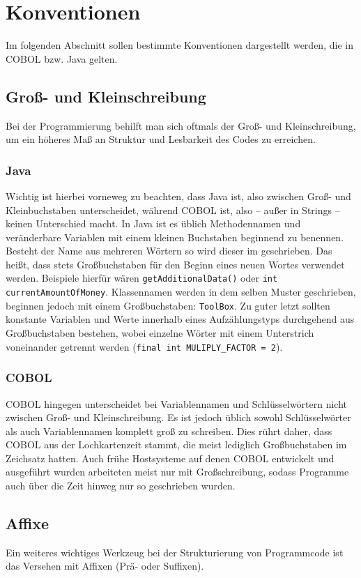 \section{Konventionen}
Im folgenden Abschnitt sollen bestimmte Konventionen dargestellt werden, die in COBOL bzw. Java gelten.
\subsection*{Groß- und Kleinschreibung}
Bei der Programmierung behilft man sich oftmals der Groß- und Kleinschreibung, um ein höheres Maß an Struktur und Lesbarkeit des Codes zu erreichen. 
\subsubsection*{Java}
Wichtig ist hierbei vorneweg zu beachten, dass Java  ist, also zwischen Groß- und Kleinbuchstaben unterscheidet, während COBOL  ist, also -- außer in Strings -- keinen Unterschied macht.
In Java ist es üblich Methodennamen und veränderbare Variablen mit einem kleinen Buchstaben beginnend zu benennen. Besteht der Name aus mehreren Wörtern so wird dieser im  geschrieben. Das heißt, dass stets Großbuchstaben für den Beginn eines neuen Wortes verwendet werden. Beispiele hierfür wären \texttt{getAdditionalData()} oder \texttt{int currentAmountOfMoney}. Klassennamen werden in dem selben Muster geschrieben, beginnen jedoch mit einem Großbuchstaben: \texttt{ToolBox}. Zu guter letzt sollten konstante Variablen und Werte innerhalb eines Aufzählungstyps durchgehend aus Großbuchstaben bestehen, wobei einzelne Wörter mit einem Unterstrich voneinander getrennt werden (\texttt{final int MULIPLY_FACTOR = 2}). 
\subsubsection*{COBOL}
COBOL hingegen unterscheidet bei Variablennamen und Schlüsselwörtern nicht zwischen Groß- und Kleinschreibung. Es ist jedoch üblich sowohl Schlüsselwörter als auch Variablennamen komplett groß zu schreiben. Dies rührt daher, dass COBOL aus der Lochkartenzeit stammt, die meist lediglich Großbuchstaben im Zeichsatz hatten. Auch frühe Hostsysteme auf denen COBOL entwickelt und ausgeführt wurden arbeiteten meist nur mit Großschreibung, sodass Programme auch über die Zeit hinweg nur so geschrieben wurden.


\subsection*{Affixe}
Ein weiteres wichtiges Werkzeug bei der Strukturierung von Programmcode ist das Versehen mit Affixen (Prä- oder Suffixen).
